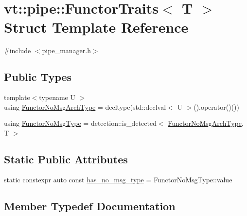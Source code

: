 \hypertarget{structvt_1_1pipe_1_1_functor_traits}{}\section{vt\+:\+:pipe\+:\+:Functor\+Traits$<$ T $>$ Struct Template Reference}
\label{structvt_1_1pipe_1_1_functor_traits}


{\ttfamily \#include $<$pipe\+\_\+manager.\+h$>$}

\subsection*{Public Types}
\begin{DoxyCompactItemize}
\item 
{\footnotesize template$<$typename U $>$ }\\using \hyperlink{structvt_1_1pipe_1_1_functor_traits_af2002cb6723439f6b1e74c7a70255cc8}{Functor\+No\+Msg\+Arch\+Type} = decltype(std\+::declval$<$ U $>$().operator()())
\item 
using \hyperlink{structvt_1_1pipe_1_1_functor_traits_a2b729de8c328206718e4eea1d9b30f9b}{Functor\+No\+Msg\+Type} = detection\+::is\+\_\+detected$<$ \hyperlink{structvt_1_1pipe_1_1_functor_traits_af2002cb6723439f6b1e74c7a70255cc8}{Functor\+No\+Msg\+Arch\+Type}, T $>$
\end{DoxyCompactItemize}
\subsection*{Static Public Attributes}
\begin{DoxyCompactItemize}
\item 
static constexpr auto const \hyperlink{structvt_1_1pipe_1_1_functor_traits_aace8b00c70112f7711ce73f1799f7e00}{has\+\_\+no\+\_\+msg\+\_\+type} = Functor\+No\+Msg\+Type\+::value
\end{DoxyCompactItemize}


\subsection{Member Typedef Documentation}
\mbox{\label{structvt_1_1pipe_1_1_functor_traits_af2002cb6723439f6b1e74c7a70255cc8}} 
